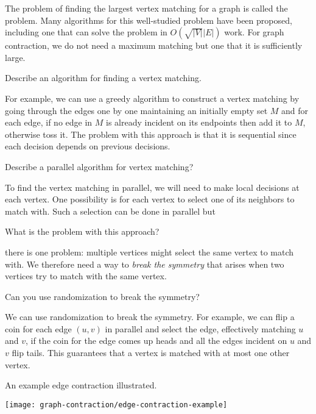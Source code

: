 {The problem of finding the largest vertex matching for a graph is
called the  problem.  Many algorithms
for this  well-studied problem have been proposed, including one that can solve the problem in
  $O(\sqrt{|V|}|E|)$ work.  For graph contraction, we do not need a
  maximum matching but one that it is sufficiently large.
%
\begin{question}
Describe an algorithm for finding a vertex matching.
\end{question}
%
For example, 
we can use a greedy algorithm to construct a vertex matching by going
through the edges one by one maintaining an initially empty set $M$
and for each edge, if no edge in $M$ is already incident on its
endpoints then add it to $M$, otherwise toss it.  The problem with
this approach is that it is sequential since each decision depends on
previous decisions.
%
\begin{question}
Describe a parallel algorithm for  vertex matching?
\end{question}
%
To find the vertex matching in parallel, we will need to make local
decisions at each vertex.  One possibility is for each vertex to
select one of its neighbors to match with.
%
Such a selection can be done in parallel but 
%
\begin{question}
What is the problem with this approach? 
\end{question}
%
there is one problem:  multiple vertices might select
the same vertex to match with.  
%
We therefore need a way
to {\em break the symmetry} that arises when two vertices try to match with the same vertex.
%
\begin{question}
Can you use randomization to break the symmetry? 
\end{question}
%
We can use randomization to break the symmetry.   For example,
we can  flip a coin for each
edge $(u,v)$ in parallel and 
select the edge, effectively matching $u$ and $v$,  if the coin
for the edge comes up heads and all the edges incident on
$u$ and $v$ flip tails.  This guarantees that a vertex is matched with
at most one other vertex.

\begin{example}
\label{ex:gc::edge-contract-example}

An example edge contraction illustrated.

\begin{center}
\texttt{[image: graph-contraction/edge-contraction-example]}
\end{center}


\end{example}}
